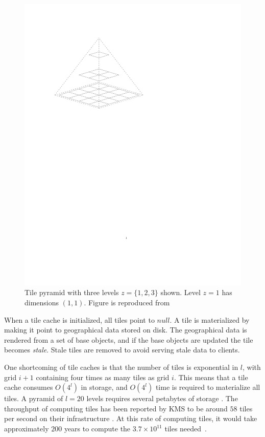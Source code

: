 \documentclass[11pt, oneside]{report}
\begin{document}
{\begin{figure}
\centering
\includegraphics[scale=0.8]{figs-tileheat/tilepyramid}
\caption{Tile pyramid with three levels $z=\{1, 2, 3\}$ shown. Level $z=1$ has dimensions $(1,1)$. Figure is reproduced from \cite{quinn10}}
\label{fig:tilepyramid}
\end{figure}

When a tile cache is initialized, all tiles point to $null$. A tile is materialized by making it point to geographical data stored on disk. The geographical data is rendered from a set of base objects, and if the base objects are updated the tile becomes \emph{stale}. Stale tiles are removed to avoid serving stale data to clients.

One shortcoming of tile caches is that the number of tiles is exponential in $l$, with grid $i+1$ containing four times as many tiles as grid $i$. This means that a tile cache consumes $O(4^l)$ in storage, and $O(4^l)$ time is required to materialize all tiles. A pyramid of $l=20$ levels requires several petabytes of storage \cite{garcia11}. The throughput of computing tiles has been reported by KMS to be around $58$ tiles per second on their infrastructure \cite{lindegaard12}. At this rate of computing tiles, it would take approximately $200$ years to compute the $3.7 \times 10^{11}$ tiles needed~\cite{garcia11}.

}
\end{document}
